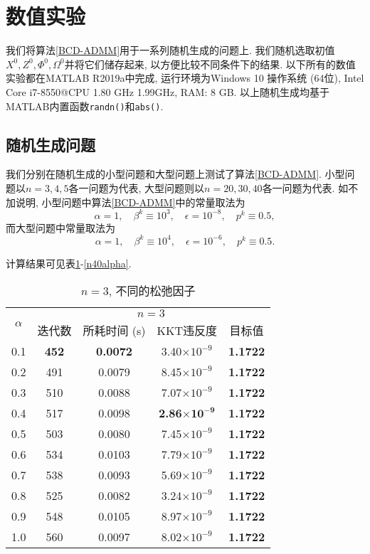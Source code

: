\section{数值实验}\label{numerical experiments}
我们将算法\ref{BCD-ADMM}用于一系列随机生成的问题上. 我们随机选取初值$X^0,Z^0,\Phi^0,\Omega^0$并将它们储存起来, 以方便比较不同条件下的结果. 以下所有的数值实验都在MATLAB R2019a中完成, 运行环境为Windows 10 操作系统 (64位), Intel Core i7-8550@CPU 1.80 GHz 1.99GHz, RAM: 8 GB. 以上随机生成均基于MATLAB内置函数\texttt{randn()}和\texttt{abs()}.

\subsection{随机生成问题}
我们分别在随机生成的小型问题和大型问题上测试了算法\ref{BCD-ADMM}. 小型问题以$n=3,4,5$各一问题为代表, 大型问题则以$n=20,30,40$各一问题为代表. 如不加说明, 小型问题中算法\ref{BCD-ADMM}中的常量取法为
$$\alpha=1,\quad\beta^k\equiv10^3,\quad\epsilon=10^{-8},\quad p^k\equiv0.5,$$
而大型问题中常量取法为
$$\alpha=1,\quad\beta^k\equiv10^4,\quad\epsilon=10^{-6},\quad p^k\equiv0.5.$$

计算结果可见表\ref{n3alpha}-\ref{n40alpha}. 
\begin{table}[htbp]
	\renewcommand{\captionfont}{\small}
    \centering
    \caption{$n=3$, 不同的松弛因子}
    \label{n3alpha}
    \vskip 4mm
    \begin{tabular}{c|c|c|c|c}
        \hline
        \multirow{2}{*}{$\alpha$} & \multicolumn{4}{c}{$n=3$}\\\cline{2-5}
          & 迭代数 & 所耗时间 (s) & KKT违反度 & 目标值\\\hline
        0.1 & \textbf{452} & \textbf{0.0072} & 3.40$\times10^{-9}$ & \textbf{1.1722} \\\hline
        0.2 & 491 & 0.0079 & 8.45$\times10^{-9}$ & \textbf{1.1722} \\\hline
        0.3 & 510 & 0.0088 & 7.07$\times10^{-9}$ & \textbf{1.1722} \\\hline
        0.4 & 517 & 0.0098 & \textbf{2.86$\mathbf{\times10^{-9}}$} & \textbf{1.1722} \\\hline
        0.5 & 503 & 0.0080 & 7.45$\times10^{-9}$ & \textbf{1.1722} \\\hline
        0.6 & 534 & 0.0103 & 7.79$\times10^{-9}$ & \textbf{1.1722} \\\hline
        0.7 & 538 & 0.0093 & 5.69$\times10^{-9}$ & \textbf{1.1722} \\\hline
        0.8 & 525 & 0.0082 & 3.24$\times10^{-9}$ & \textbf{1.1722} \\\hline
        0.9 & 548 & 0.0105 & 8.97$\times10^{-9}$ & \textbf{1.1722} \\\hline
        1.0 & 560 & 0.0097 & 8.02$\times10^{-9}$ & \textbf{1.1722} \\\hline
    \end{tabular}
\end{table}

